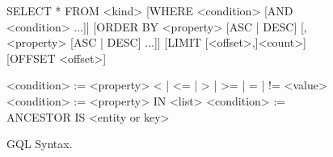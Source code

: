 \begin{figure*}[ht] %
\begin{center}
\begin{code}
  SELECT * FROM <kind>
    [WHERE <condition> [AND <condition> ...]]
    [ORDER BY <property> [ASC | DESC] [, <property> [ASC | DESC] ...]]
    [LIMIT [<offset>,]<count>]
    [OFFSET <offset>]

  <condition> := <property> {< | <= | > | >= | = | != } <value>
  <condition> := <property> IN <list>
  <condition> := ANCESTOR IS <entity or key>
\end{code}
\caption{GQL Syntax.\label{gql-syntax}}
\end{center}
\end{figure*}


